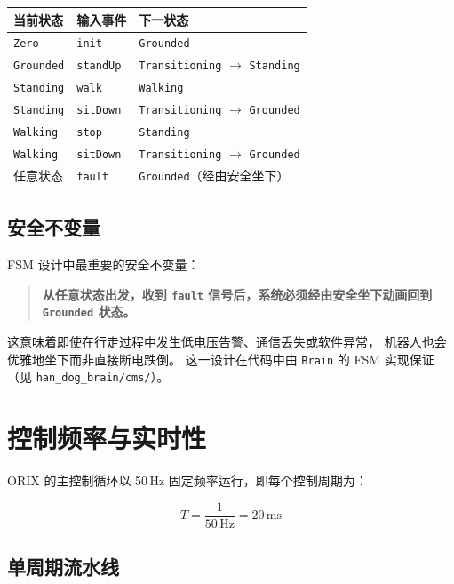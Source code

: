 \documentclass[a4paper,11pt,openany]{book}
\begin{document}
\begin{longtable}{lll}
\toprule
当前状态 & 输入事件 & 下一状态 \\
\midrule
\texttt{Zero} & \texttt{init} & \texttt{Grounded} \\
\texttt{Grounded} & \texttt{standUp} & \texttt{Transitioning} $\to$ \texttt{Standing} \\
\texttt{Standing} & \texttt{walk} & \texttt{Walking} \\
\texttt{Standing} & \texttt{sitDown} & \texttt{Transitioning} $\to$ \texttt{Grounded} \\
\texttt{Walking} & \texttt{stop} & \texttt{Standing} \\
\texttt{Walking} & \texttt{sitDown} & \texttt{Transitioning} $\to$ \texttt{Grounded} \\
任意状态 & \texttt{fault} & \texttt{Grounded}（经由安全坐下） \\
\bottomrule
\end{longtable}

\subsection{安全不变量}

FSM 设计中最重要的安全不变量：

\begin{quote}
\textbf{从任意状态出发，收到 \texttt{fault} 信号后，系统必须经由安全坐下动画回到 \texttt{Grounded} 状态。}
\end{quote}

这意味着即使在行走过程中发生低电压告警、通信丢失或软件异常，
机器人也会优雅地坐下而非直接断电跌倒。
这一设计在代码中由 \texttt{Brain} 的 FSM 实现保证（见 \texttt{han\_dog\_brain/cms/}）。

\section{控制频率与实时性}
\label{sec:control-freq}

ORIX 的主控制循环以 50\,Hz 固定频率运行，即每个控制周期为：

\begin{equation}
T = \frac{1}{50\,\mathrm{Hz}} = 20\,\mathrm{ms}
\end{equation}

\subsection{单周期流水线}
\end{document}

